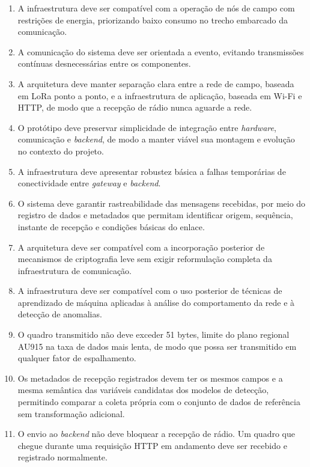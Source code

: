 \begin{enumerate}
    \item[RNF-I1.] A infraestrutura deve ser compatível com a operação de nós de campo com restrições de energia, priorizando baixo consumo no trecho embarcado da comunicação.

    \item[RNF-I2.] A comunicação do sistema deve ser orientada a evento, evitando transmissões contínuas desnecessárias entre os componentes.

    \item[RNF-I3.] A arquitetura deve manter separação clara entre a rede de campo, baseada em LoRa ponto a ponto, e a infraestrutura de aplicação, baseada em Wi-Fi e HTTP, de modo que a recepção de rádio nunca aguarde a rede.

    \item[RNF-I4.] O protótipo deve preservar simplicidade de integração entre \textit{hardware}, comunicação e \textit{backend}, de modo a manter viável sua montagem e evolução no contexto do projeto.

    \item[RNF-I5.] A infraestrutura deve apresentar robustez básica a falhas temporárias de conectividade entre \textit{gateway} e \textit{backend}.

    \item[RNF-I6.] O sistema deve garantir rastreabilidade das mensagens recebidas, por meio do registro de dados e metadados que permitam identificar origem, sequência, instante de recepção e condições básicas do enlace.

    \item[RNF-I7.] A arquitetura deve ser compatível com a incorporação posterior de mecanismos de criptografia leve sem exigir reformulação completa da infraestrutura de comunicação.

    \item[RNF-I8.] A infraestrutura deve ser compatível com o uso posterior de técnicas de aprendizado de máquina aplicadas à análise do comportamento da rede e à detecção de anomalias.
    
    \item[RNF-I9.] O quadro transmitido não deve exceder 51 bytes, limite do plano regional AU915 na taxa de dados mais lenta, de modo que possa ser transmitido em qualquer fator de espalhamento.

    \item[RNF-I10.] Os metadados de recepção registrados devem ter os mesmos campos e a mesma semântica das variáveis candidatas dos modelos de detecção, permitindo comparar a coleta própria com o conjunto de dados de referência sem transformação adicional.

    \item[RNF-I11.] O envio ao \textit{backend} não deve bloquear a recepção de rádio. Um quadro que chegue durante uma requisição HTTP em andamento deve ser recebido e registrado normalmente.

\end{enumerate}


